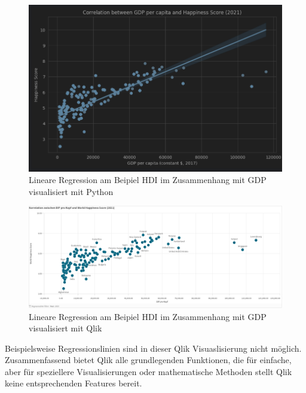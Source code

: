 \documentclass[12pt]{article}
\begin{document}
	\begin{figure}[h]
		\centering
		\includegraphics[width=1.0\textwidth]{BIP_WHR_python}
		\caption{Lineare Regression am Beipiel HDI im Zusammenhang mit GDP visualisiert mit Python}
	\end{figure}
	\begin{figure}[h]
		\centering
		\includegraphics[width=1.0\textwidth]{BIP_WHR_qlik}
		\caption{Lineare Regression am Beipiel HDI im Zusammenhang mit GDP visualisiert mit Qlik}
	\end{figure}
	
	Beispielsweise Regressionslinien sind in dieser Qlik Visuaslisierung nicht möglich.
	Zusammenfassend bietet Qlik alle grundlegenden Funktionen, die für einfache, aber für speziellere Visualisierungen oder mathematische Methoden stellt Qlik keine entsprechenden Features bereit.
	
\end{document}
